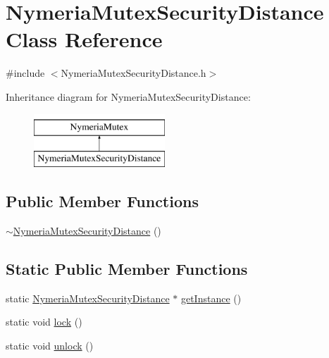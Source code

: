 \hypertarget{class_nymeria_mutex_security_distance}{}\section{Nymeria\+Mutex\+Security\+Distance Class Reference}
\label{class_nymeria_mutex_security_distance}


{\ttfamily \#include $<$Nymeria\+Mutex\+Security\+Distance.\+h$>$}

Inheritance diagram for Nymeria\+Mutex\+Security\+Distance\+:\begin{figure}[H]
\begin{center}
\leavevmode
\includegraphics[height=2.000000cm]{class_nymeria_mutex_security_distance}
\end{center}
\end{figure}
\subsection*{Public Member Functions}
\begin{DoxyCompactItemize}
\item 
\hyperlink{class_nymeria_mutex_security_distance_a8dcc9a0342a2520db12cd458c15f04c5}{$\sim$\+Nymeria\+Mutex\+Security\+Distance} ()
\end{DoxyCompactItemize}
\subsection*{Static Public Member Functions}
\begin{DoxyCompactItemize}
\item 
static \hyperlink{class_nymeria_mutex_security_distance}{Nymeria\+Mutex\+Security\+Distance} $\ast$ \hyperlink{class_nymeria_mutex_security_distance_a7de1c0314682fcdecf8e882eab57362b}{get\+Instance} ()
\item 
static void \hyperlink{class_nymeria_mutex_security_distance_a983390ed9dcef9b62c3df39f47e5bbe7}{lock} ()
\item 
static void \hyperlink{class_nymeria_mutex_security_distance_a13d05cc109b0198a05091f0e2b108db5}{unlock} ()
\end{DoxyCompactItemize}


